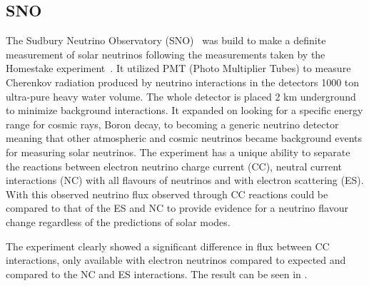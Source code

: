 \subsection{SNO}
The Sudbury Neutrino Observatory (SNO)~\cite{Fix6} was build to make a definite measurement of solar neutrinos following the measurements taken by the Homestake experiment~\cite{9Davis}. It utilized PMT (Photo Multiplier Tubes) to measure Cherenkov radiation produced by neutrino interactions in the detectors 1000 ton ultra-pure heavy water volume. The whole detector is placed 2 km underground to minimize background interactions. It expanded on looking for a specific energy range for cosmic rays, Boron decay, to becoming a generic neutrino detector meaning that other atmospheric and cosmic neutrinos became background events for measuring solar neutrinos. The experiment has a unique ability to separate the reactions between electron neutrino charge current (CC), neutral current interactions (NC) with all flavours of neutrinos and with electron scattering (ES). With this observed neutrino flux observed through CC reactions could be compared to that of the ES  and NC to provide evidence for a neutrino flavour change regardless of the predictions of solar modes.

The experiment clearly showed a significant difference in flux between CC interactions, only available with electron neutrinos compared to expected and compared to the NC and ES interactions. The result can be seen in .

